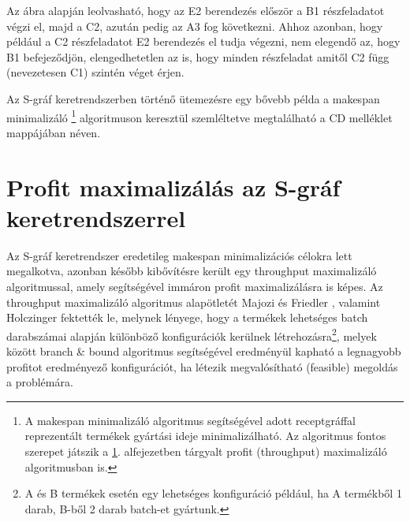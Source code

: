 Az ábra alapján leolvasható, hogy az E2 berendezés először a B1 részfeladatot végzi el, majd a C2, azután pedig az A3 fog következni.
Ahhoz azonban, hogy például a C2 részfeladatot E2 berendezés el tudja végezni, nem elegendő az, hogy B1 befejeződjön, elengedhetetlen az is, hogy minden részfeladat amitől C2 függ (nevezetesen C1) szintén véget érjen.

Az S-gráf keretrendszerben történő ütemezésre egy bővebb példa a makespan minimalizáló \footnote{A makespan minimalizáló algoritmus segítségével adott receptgráffal reprezentált termékek gyártási ideje minimalizálható. Az algoritmus fontos szerepet játszik a \ref{SgraphProfitMax}. alfejezetben tárgyalt profit (throughput) maximalizáló algoritmusban is.} algoritmuson keresztül szemléltetve megtalálható a CD melléklet  mappájában  néven. 
\section{Profit maximalizálás az S-gráf keretrendszerrel} \label{SgraphProfitMax}
Az S-gráf keretrendszer eredetileg makespan minimalizációs célokra lett megalkotva, azonban később kibővítésre került egy throughput maximalizáló algoritmussal, amely segítségével immáron profit maximalizálásra is képes.
Az throughput maximalizáló algoritmus alapötletét Majozi és Friedler \cite{doi:10.1021ie0604472}, valamint Holczinger \cite{HOLCZINGER2007649} fektették le, melynek lényege, hogy a termékek lehetséges batch darabszámai alapján különböző konfigurációk kerülnek létrehozásra\footnote{A és B termékek esetén egy lehetséges konfiguráció például, ha A termékből 1 darab, B-ből 2 darab batch-et gyártunk.}, melyek között branch \& bound algoritmus segítségével eredményül kapható a legnagyobb profitot eredményező konfigurációt, ha létezik megvalósítható (feasible) megoldás a problémára.

